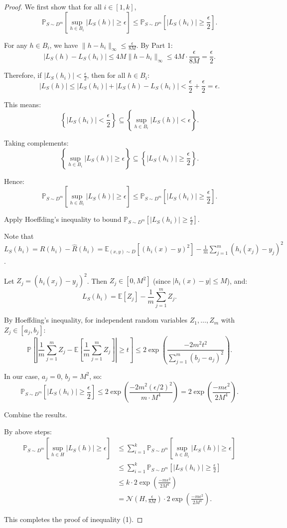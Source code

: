 \documentclass[letterpaper, 11pt]{article}
\newcommand{\1}{\mathds{1}}	%
\theoremstyle{definition}
\begin{document}
\begin{proof}
We first show that for all $i \in [1, k]$,
\[
\mathbb{P}_{S \sim D^m}\left[\sup_{h \in B_i} |L_S(h)| \geq \epsilon\right] \leq \mathbb{P}_{S \sim D^m}\left[|L_S(h_i)| \geq \frac{\epsilon}{2}\right].
\]

For any $h \in B_i$, we have $\|h - h_i\|_\infty \leq \frac{\epsilon}{8M}$. By Part 1:
\[
|L_S(h) - L_S(h_i)| \leq 4M \|h - h_i\|_\infty \leq 4M \cdot \frac{\epsilon}{8M} = \frac{\epsilon}{2}.
\]

Therefore, if $|L_S(h_i)| < \frac{\epsilon}{2}$, then for all $h \in B_i$:
\[
|L_S(h)| \leq |L_S(h_i)| + |L_S(h) - L_S(h_i)| < \frac{\epsilon}{2} + \frac{\epsilon}{2} = \epsilon.
\]

This means:
\[
\left\{|L_S(h_i)| < \frac{\epsilon}{2}\right\} \subseteq \left\{\sup_{h \in B_i} |L_S(h)| < \epsilon\right\}.
\]

Taking complements:
\[
\left\{\sup_{h \in B_i} |L_S(h)| \geq \epsilon\right\} \subseteq \left\{|L_S(h_i)| \geq \frac{\epsilon}{2}\right\}.
\]

Hence:
\[
\mathbb{P}_{S \sim D^m}\left[\sup_{h \in B_i} |L_S(h)| \geq \epsilon\right] \leq \mathbb{P}_{S \sim D^m}\left[|L_S(h_i)| \geq \frac{\epsilon}{2}\right].
\]

Apply Hoeffding's inequality to bound $\mathbb{P}_{S \sim D^m}[|L_S(h_i)| \geq \frac{\epsilon}{2}]$.

Note that $L_S(h_i) = R(h_i) - \widehat{R}(h_i) = \mathbb{E}_{(x,y)\sim D}[(h_i(x) - y)^2] - \frac{1}{m}\sum_{j=1}^m (h_i(x_j) - y_j)^2$.

Let $Z_j = (h_i(x_j) - y_j)^2$. Then $Z_j \in [0, M^2]$ (since $|h_i(x) - y| \leq M$), and:
\[
L_S(h_i) = \mathbb{E}[Z_j] - \frac{1}{m}\sum_{j=1}^m Z_j.
\]

By Hoeffding's inequality, for independent random variables $Z_1, \ldots, Z_m$ with $Z_j \in [a_j, b_j]$:
\[
\mathbb{P}\left[\left|\frac{1}{m}\sum_{j=1}^m Z_j - \mathbb{E}\left[\frac{1}{m}\sum_{j=1}^m Z_j\right]\right| \geq t\right] \leq 2\exp\left(\frac{-2m^2t^2}{\sum_{j=1}^m (b_j - a_j)^2}\right).
\]

In our case, $a_j = 0$, $b_j = M^2$, so:
\[
\mathbb{P}_{S \sim D^m}\left[|L_S(h_i)| \geq \frac{\epsilon}{2}\right] \leq 2\exp\left(\frac{-2m^2(\epsilon/2)^2}{m \cdot M^4}\right) = 2\exp\left(\frac{-m\epsilon^2}{2M^4}\right).
\]

Combine the results.

By above steps:
\begin{align*}
\mathbb{P}_{S \sim D^m}\left[\sup_{h \in H} |L_S(h)| \geq \epsilon\right] &\leq \sum_{i=1}^k \mathbb{P}_{S \sim D^m}\left[\sup_{h \in B_i} |L_S(h)| \geq \epsilon\right]\\
&\leq \sum_{i=1}^k \mathbb{P}_{S \sim D^m}\left[|L_S(h_i)| \geq \frac{\epsilon}{2}\right]\\
&\leq k \cdot 2\exp\left(\frac{-m\epsilon^2}{2M^4}\right)\\
&= \mathcal{N}\left(H, \frac{\epsilon}{8M}\right) \cdot 2\exp\left(\frac{-m\epsilon^2}{2M^4}\right).
\end{align*}

This completes the proof of inequality (1).
\end{proof}
\end{document}
